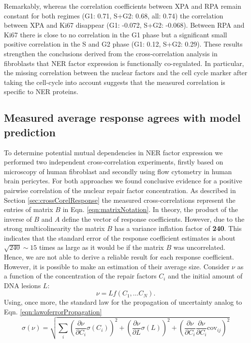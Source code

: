 Remarkably, whereas the correlation coefficients between XPA and RPA remain constant for both regimes (G1: 0.71, S+G2: 0.68, all: 0.74) the correlation between XPA and Ki67 disappear (G1: -0.072, S+G2: -0.068). Between RPA and Ki67 there is close to no correlation in the G1 phase but a significant small positive correlation in the S and G2 phase (G1: 0.12, S+G2: 0.29). These results strengthen the conclusions derived from the cross-correlation analysis in fibroblasts that NER factor expression is functionally co-regulated. In particular, the missing correlation between the nuclear factors and the cell cycle marker after taking the cell-cycle into account suggests that the measured correlation is specific to NER proteins. 


\subsection{Measured average response agrees with model prediction}
To determine potential mutual dependencies in NER factor expression we performed two independent cross-correlation experiments, firstly based on microscopy of human fibroblast and secondly using flow cytometry in human brain pericytes. For both approaches we found conclusive evidence for a positive pairwise correlation of the nuclear repair factor concentration. As described in Section \ref{sec:crossCorelResponse} the measured cross-correlations represent the entries of matrix $B$ in Eqn. \ref{eqn:matrixNotation}. In theory, the product of the inverse of $B$ and $A$ define the vector of response coefficients. However, due to the strong multicolinearity the matrix $B$ has a variance inflation factor of \textbf{240}. This indicates that the standard error of the response coefficient estimates is about $\sqrt{240} \sim 15$ times as large as it would be if the matrix $B$ was uncorrelated.\\   
Hence, we are not able to derive a reliable result for each response coefficient. However, it is possible to make an estimation of their average size. Consider $\nu$ as a function of the concentration of the repair factors $C_i$ and the initial amount of DNA lesions $L$:
\begin{equation}
	\nu = Lf(C_1,...C_N).
\end{equation}
Using, once more, the standard law for the propagation of uncertainty analog to Eqn. \ref{eqn:lawoferrorPropagation}
 \begin{equation}
 \sigma(\nu) = \sqrt{\sum_{i}\left(\frac{\partial \nu}{\partial C_i}\sigma(C_i) \right)^2 + \left(\frac{\partial \nu}{\partial L}\sigma(L)\right)^2 + \left(\frac{\partial \nu}{\partial C_i} \frac{\partial \nu}{\partial C_i}\textrm{cov}_{ij}\right)^2}
 \end{equation}  
 
